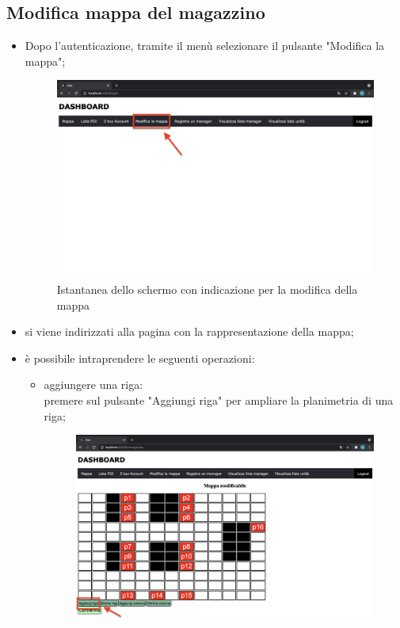 \subsection{Modifica mappa del magazzino}
\begin{itemize}
    \item Dopo l'autenticazione, tramite il menù selezionare il pulsante "Modifica la mappa";
    \begin{figure}[H]
        \centering
        \includegraphics[scale=0.12]{res/images/dashboard6.png}
        \caption{Istantanea dello schermo con indicazione per la modifica della mappa}
    \end{figure}
    \item si viene indirizzati alla pagina con la rappresentazione della mappa;
    \item è possibile intraprendere le seguenti operazioni:
        \begin{itemize}
            \item aggiungere una riga: \\premere sul pulsante "Aggiungi riga" per ampliare la planimetria di una riga;
            \begin{figure}[H]
                \centering
                \includegraphics[scale=0.12]{res/images/modificamappa1.png}

\end{figure}
\end{itemize}
\end{itemize}
